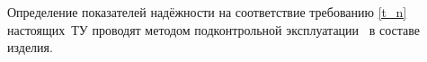 Определение показателей надёжности на соответствие требованию \ref{t_n} настоящих~ТУ проводят методом подконтрольной эксплуатации \dut \ в составе изделия.